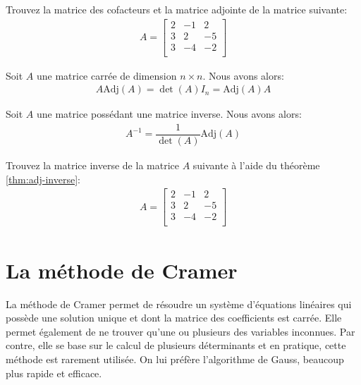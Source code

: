 \documentclass[]{book}
\theoremstyle{definition}
\theoremstyle{definition}
\theoremstyle{definition}
\theoremstyle{remark}
\let\BeginKnitrBlock\begin \let\EndKnitrBlock\end
\begin{document}
\BeginKnitrBlock{example}
\protect\hypertarget{exm:unnamed-chunk-109}{}{\label{exm:unnamed-chunk-109} }Trouvez la matrice des cofacteurs et la matrice adjointe de la matrice suivante:
\begin{align*}
A=\begin{bmatrix}
2&-1&2\\
3&2&-5\\
3&-4&-2\\
\end{bmatrix}
\end{align*}
\EndKnitrBlock{example}

\BeginKnitrBlock{theorem}
\protect\hypertarget{thm:unnamed-chunk-110}{}{\label{thm:unnamed-chunk-110} }Soit \(A\) une matrice carrée de dimension \(n \times n\). Nous avons alors:
\begin{align*}
    A\text{Adj}(A) = \det(A)I_n = \text{Adj}(A)A
\end{align*}
\EndKnitrBlock{theorem}

\BeginKnitrBlock{theorem}
\protect\hypertarget{thm:adj-inverse}{}{\label{thm:adj-inverse} }Soit \(A\) une matrice possédant une matrice inverse. Nous avons alors:
\begin{align*}
A^{-1} = \dfrac{1}{\det(A)}\text{Adj}(A)
\end{align*}
\EndKnitrBlock{theorem}

\BeginKnitrBlock{example}
\protect\hypertarget{exm:unnamed-chunk-111}{}{\label{exm:unnamed-chunk-111} }Trouvez la matrice inverse de la matrice \(A\) suivante à l'aide du théorème \ref{thm:adj-inverse}:
\begin{align*}
A=\begin{bmatrix}
2&-1&2\\
3&2&-5\\
3&-4&-2\\
\end{bmatrix}
\end{align*}
\EndKnitrBlock{example}

\hypertarget{la-methode-de-cramer}{%
\section{La méthode de Cramer}\label{la-methode-de-cramer}}

La méthode de Cramer permet de résoudre un système d'équations linéaires qui possède une solution unique et dont la matrice des coefficients est carrée. Elle permet également de ne trouver qu'une ou plusieurs des variables inconnues. Par contre, elle se base sur le calcul de plusieurs déterminants et en pratique, cette méthode est rarement utilisée. On lui préfère l'algorithme de Gauss, beaucoup plus rapide et efficace.
\end{document}

